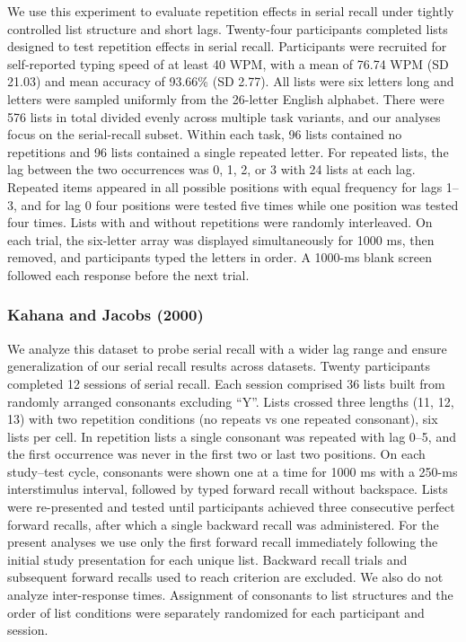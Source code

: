 \documentclass[
  letterpaper,
  11pt,
  english,
  singlespacing,
  headsepline]{MastersDoctoralThesis}
\begin{document}
We use this experiment to evaluate repetition effects in serial recall
under tightly controlled list structure and short lags. Twenty-four
participants completed lists designed to test repetition effects in
serial recall. Participants were recruited for self-reported typing
speed of at least 40 WPM, with a mean of 76.74 WPM (SD 21.03) and mean
accuracy of 93.66\% (SD 2.77). All lists were six letters long and
letters were sampled uniformly from the 26-letter English alphabet.
There were 576 lists in total divided evenly across multiple task
variants, and our analyses focus on the serial-recall subset. Within
each task, 96 lists contained no repetitions and 96 lists contained a
single repeated letter. For repeated lists, the lag between the two
occurrences was 0, 1, 2, or 3 with 24 lists at each lag. Repeated items
appeared in all possible positions with equal frequency for lags 1--3,
and for lag 0 four positions were tested five times while one position
was tested four times. Lists with and without repetitions were randomly
interleaved. On each trial, the six-letter array was displayed
simultaneously for 1000 ms, then removed, and participants typed the
letters in order. A 1000-ms blank screen followed each response before
the next trial.

\subsubsection{Kahana and Jacobs (2000)}\label{kahana2000interresponse}

We analyze this dataset to probe serial recall with a wider lag range
and ensure generalization of our serial recall results across datasets.
Twenty participants completed 12 sessions of serial recall. Each session
comprised 36 lists built from randomly arranged consonants excluding
``Y''. Lists crossed three lengths (11, 12, 13) with two repetition
conditions (no repeats vs one repeated consonant), six lists per cell.
In repetition lists a single consonant was repeated with lag 0--5, and
the first occurrence was never in the first two or last two positions.
On each study--test cycle, consonants were shown one at a time for 1000
ms with a 250-ms interstimulus interval, followed by typed forward
recall without backspace. Lists were re-presented and tested until
participants achieved three consecutive perfect forward recalls, after
which a single backward recall was administered. For the present
analyses we use only the first forward recall immediately following the
initial study presentation for each unique list. Backward recall trials
and subsequent forward recalls used to reach criterion are excluded. We
also do not analyze inter-response times. Assignment of consonants to
list structures and the order of list conditions were separately
randomized for each participant and session.
\end{document}
